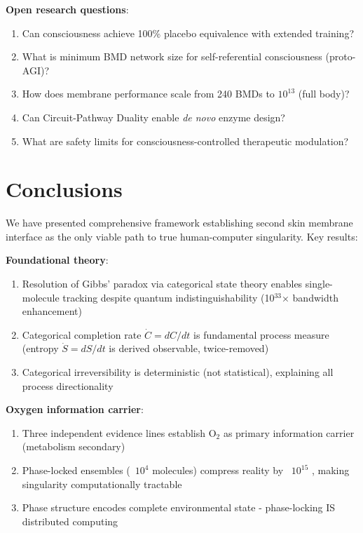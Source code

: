 \documentclass[11pt,a4paper]{article}
\theoremstyle{definition}
\theoremstyle{remark}
\begin{document}
\textbf{Open research questions}:
\begin{enumerate}
\item Can consciousness achieve 100\% placebo equivalence with extended training?
\item What is minimum BMD network size for self-referential consciousness (proto-AGI)?
\item How does membrane performance scale from 240 BMDs to $10^{13}$ (full body)?
\item Can Circuit-Pathway Duality enable \textit{de novo} enzyme design?
\item What are safety limits for consciousness-controlled therapeutic modulation?
\end{enumerate}

\section{Conclusions}

We have presented comprehensive framework establishing second skin membrane interface as the only viable path to true human-computer singularity. Key results:

\textbf{Foundational theory}:
\begin{enumerate}
\item Resolution of Gibbs' paradox via categorical state theory enables single-molecule tracking despite quantum indistinguishability (10$^{33}$× bandwidth enhancement)
\item Categorical completion rate $\dot{C} = dC/dt$ is fundamental process measure (entropy $\dot{S} = dS/dt$ is derived observable, twice-removed)
\item Categorical irreversibility is deterministic (not statistical), explaining all process directionality
\end{enumerate}

\textbf{Oxygen information carrier}:
\begin{enumerate}
\item Three independent evidence lines establish O$_2$ as primary information carrier (metabolism secondary)
\item Phase-locked ensembles (~$10^4$ molecules) compress reality by ~$10^{15}$ \times, making singularity computationally tractable
\item Phase structure encodes complete environmental state - phase-locking IS distributed computing
\end{enumerate}
\end{document}
